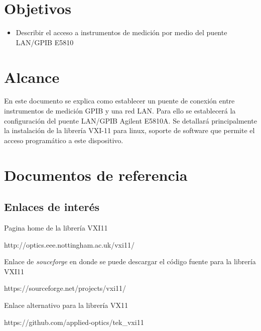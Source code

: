 \documentclass[paper=letter,oneside,fontsize=11pt, parskip=full]{scrartcl}
\newenvironment{link}
	{\ttfamily}{}
\begin{document}
	
	\clearpage
	
	\tableofcontents
	
	\section{Objetivos}
		\begin{itemize}
			\item Describir el acceso a instrumentos de medición por medio del puente LAN/GPIB E5810
		
		\end{itemize}
		
	\section{Alcance}
	
		En este documento se explica como establecer un puente de conexión entre instrumentos de medición GPIB y una red LAN. Para ello se establecerá la configuración del puente LAN/GPIB Agilent E5810A. Se detallará principalmente la instalación de la librería
		 VXI-11 para linux, soporte de software que permite el acceso programático a este dispositivo.	
		
	\section{Documentos de referencia}
	
		\subsection{Enlaces de interés}	
		
			Pagina home de la librería VXI11
			
			\begin{link}
				http://optics.eee.nottingham.ac.uk/vxi11/
			\end{link}	
		
			Enlace de \emph{souceforge} en donde se puede descargar el código fuente para la librería VXI11
			
			\begin{link}
				https://sourceforge.net/projects/vxi11/
			\end{link}	
		
		
			Enlace alternativo para la librería VX11
		
			\begin{link}		
				https://github.com/applied-optics/tek\_vxi11		
			\end{link}	
		
\end{document}
